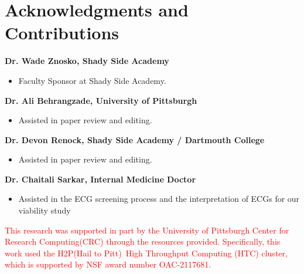\documentclass[
	a4paper, 
	10pt, 
	twoside, 
]{LTJournalArticle}
\begin{document}
\section{Acknowledgments and Contributions}
\textbf{Dr. Wade Znosko, Shady Side Academy }
\begin{itemize}
    \item Faculty Sponsor at Shady Side Academy. 
\end{itemize}
\textbf{Dr. Ali Behrangzade, University of Pittsburgh}
\begin{itemize}
    \item Assisted in paper review and editing. 
\end{itemize}
\textbf{Dr. Devon Renock, Shady Side Academy / Dartmouth College}
\begin{itemize}
    \item Assisted in paper review and editing. 
\end{itemize}
\textbf{Dr. Chaitali Sarkar, Internal Medicine Doctor}
\begin{itemize}
    \item Assisted in the ECG screening process and the interpretation of ECGs for our viability study
\end{itemize}
\textcolor{red}{This research was supported in part by the University of Pittsburgh Center for Research Computing(CRC) through the resources provided. Specifically, this work used the H2P(Hail to Pitt) High Throughput Computing (HTC) cluster, which is supported by NSF award number OAC-2117681.}
\newpage
\printbibliography 
\end{document}
